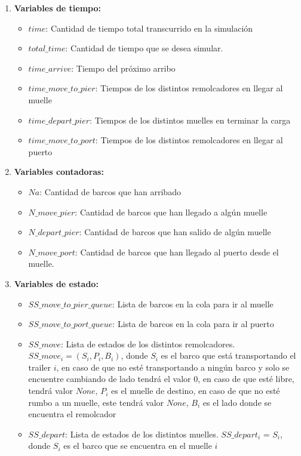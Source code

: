\documentclass[titlepage,11pt]{scrartcl}
\begin{document}
	\begin{enumerate}
		\item \textbf{Variables de tiempo:}
			\begin{itemize}
				\item $time$: Cantidad de tiempo total transcurrido en la simulación
				\item $total\_time$: Cantidad de tiempo que se desea simular.
				\item $time\_arrive$: Tiempo del próximo arribo
				\item $time\_move\_to\_pier$: Tiempos de los distintos remolcadores en llegar al muelle
				\item $time\_depart\_pier$: Tiempos de los distintos muelles en terminar la carga
				\item $time\_move\_to\_port$: Tiempos de los distintos remolcadores en llegar al puerto
			\end{itemize}
		\item \textbf{Variables contadoras:}
			\begin{itemize}
				\item $Na$: Cantidad de barcos que han arribado
				\item $N\_move\_pier$: Cantidad de barcos que han llegado a algún muelle
				\item $N\_depart\_pier$: Cantidad de barcos que han salido de algún muelle
				\item $N\_move\_port$: Cantidad de barcos que han llegado al puerto desde el muelle.
			\end{itemize}
		\item \textbf{Variables de estado:}
			\begin{itemize}
				\item $SS\_move\_to\_pier\_queue$: Lista de barcos en la cola para ir al muelle
				\item $SS\_move\_to\_port\_queue$: Lista de barcos en la cola para ir al puerto
				\item $SS\_move$: Lista de estados de los distintos remolcadores. $SS\_move_i = (S_i, P_i, B_i)$, donde $S_i$ es el barco que está transportando el trailer $i$, en caso de que no esté transportando a ningún barco y solo se encuentre cambiando de lado tendrá el valor $0$, en caso de que esté libre, tendrá valor $None$, $P_i$ es el muelle de destino, en caso de que no esté rumbo a un muelle, este tendrá valor $None$, $B_i$ es el lado donde se encuentra el remolcador
				\item $SS\_depart$: Lista de estados de los distintos muelles. $SS\_depart_i$ = $S_i$, donde $S_i$ es el barco que se encuentra en el muelle $i$

\end{itemize}
\end{enumerate}
\end{document}
